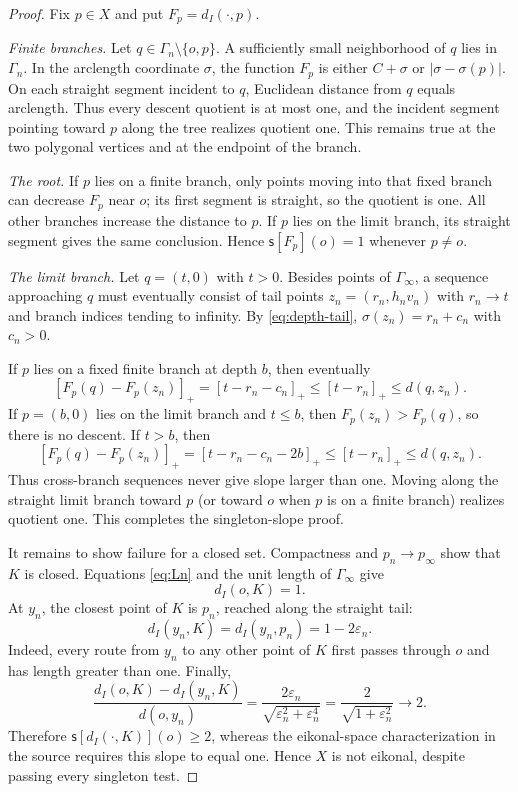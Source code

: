 \documentclass[11pt]{article}
\newcommand{\slope}{\mathsf{s}}
\begin{document}
\begin{proof}
Fix $p\in X$ and put $F_p=d_I(\cdot,p)$.

\emph{Finite branches.}
Let $q\in\Gamma_n\setminus\{o,p\}$. A sufficiently small neighborhood of
$q$ lies in $\Gamma_n$. In the arclength coordinate $\sigma$, the function
$F_p$ is either $C+\sigma$ or $|\sigma-\sigma(p)|$. On each straight segment
incident to $q$, Euclidean distance from $q$ equals arclength. Thus every
descent quotient is at most one, and the incident segment pointing toward
$p$ along the tree realizes quotient one. This remains true at the two
polygonal vertices and at the endpoint of the branch.

\emph{The root.}
If $p$ lies on a finite branch, only points moving into that fixed branch can
decrease $F_p$ near $o$; its first segment is straight, so the quotient is
one. All other branches increase the distance to $p$. If $p$ lies on the
limit branch, its straight segment gives the same conclusion. Hence
$\slope[F_p](o)=1$ whenever $p\ne o$.

\emph{The limit branch.}
Let $q=(t,0)$ with $t>0$. Besides points of $\Gamma_\infty$, a sequence
approaching $q$ must eventually consist of tail points
$z_n=(r_n,h_n v_n)$ with $r_n\to t$ and branch indices tending to infinity.
By \eqref{eq:depth-tail}, $\sigma(z_n)=r_n+c_n$ with $c_n>0$.

If $p$ lies on a fixed finite branch at depth $b$, then eventually
\[
 [F_p(q)-F_p(z_n)]_+
 =[t-r_n-c_n]_+
 \leq[t-r_n]_+
 \leq d(q,z_n).
\]
If $p=(b,0)$ lies on the limit branch and $t\leq b$, then
$F_p(z_n)>F_p(q)$, so there is no descent. If $t>b$, then
\[
 [F_p(q)-F_p(z_n)]_+
 =[t-r_n-c_n-2b]_+
 \leq[t-r_n]_+
 \leq d(q,z_n).
\]
Thus cross-branch sequences never give slope larger than one. Moving along
the straight limit branch toward $p$ (or toward $o$ when $p$ is on a finite
branch) realizes quotient one. This completes the singleton-slope proof.

It remains to show failure for a closed set. Compactness and
$p_n\to p_\infty$ show that $K$ is closed. Equations \eqref{eq:Ln} and the
unit length of $\Gamma_\infty$ give
\[
  d_I(o,K)=1.
\]
At $y_n$, the closest point of $K$ is $p_n$, reached along the straight tail:
\[
  d_I(y_n,K)=d_I(y_n,p_n)=1-2\varepsilon_n.
\]
Indeed, every route from $y_n$ to any other point of $K$ first passes through
$o$ and has length greater than one. Finally,
\[
 \frac{d_I(o,K)-d_I(y_n,K)}{d(o,y_n)}
 =\frac{2\varepsilon_n}
 {\sqrt{\varepsilon_n^2+\varepsilon_n^4}}
 =\frac{2}{\sqrt{1+\varepsilon_n^2}}
 \longrightarrow2.
\]
Therefore $\slope[d_I(\cdot,K)](o)\geq2$, whereas the eikonal-space
characterization in the source requires this slope to equal one. Hence $X$
is not eikonal, despite passing every singleton test.
\end{proof}
\end{document}
